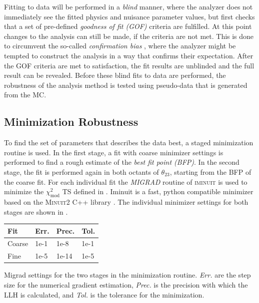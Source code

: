 Fitting to data will be performed in a \textit{blind} manner, where the analyzer does not immediately see the fitted physics and nuisance parameter values, but first checks that a set of pre-defined \textit{goodness of fit (GOF)} criteria are fulfilled. At this point changes to the analysis can still be made, if the criteria are not met. This is done to circumvent the so-called \textit{confirmation bias} , where the analyzer might be tempted to construct the analysis in a way that confirms their expectation. After the GOF criteria are met to satisfaction, the fit results are unblinded and the full result can be revealed. Before these blind fits to data are performed, the robustness of the analysis method is tested using pseudo-data that is generated from the MC.


\subsection{Minimization Robustness} 

To find the set of parameters that describes the data best, a staged minimization routine is used. In the first stage, a fit with coarse minimizer settings is performed to find a rough estimate of the \textit{best fit point (BFP)}. In the second stage, the fit is performed again in both octants of $\theta_{23}$, starting from the BFP of the coarse fit. For each individual fit the \textit{MIGRAD} routine of \textsc{iminuit}  is used to minimize the $\chi^2_{\mathrm{mod}}$ TS defined in . Iminuit is a fast, python compatible minimizer based on the \textsc{Minuit2} C++ library . The individual minimizer settings for both stages are shown in .

\begin{margintable}
    \small
        \begin{tabular}{ llll }
        \hline\hline
        \textbf{Fit} & \textbf{Err.} & \textbf{Prec.} & \textbf{Tol.} \\        
        \hline\hline    
        Coarse & 1e-1 & 1e-8 & 1e-1 \\
        Fine & 1e-5 & 1e-14 & 1e-5 \\    
        \hline
        \end{tabular}
    \caption[Staged minimization routine settings]{Migrad settings for the two stages in the minimization routine. \textit{Err.} are the step size for the numerical gradient estimation, \textit{Prec.} is the precision with which the LLH is calculated, and \textit{Tol.} is the tolerance for the minimization.}
\end{margintable}

